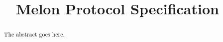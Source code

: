 \documentclass[conference]{IEEEtran}
\begin{document}
%
\title{Melon Protocol Specification}


\author{
}


% 


\maketitle

\begin{abstract}
The abstract goes here.
\end{abstract}
\end{document}
